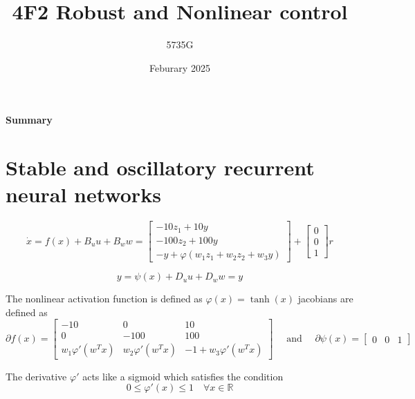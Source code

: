 \documentclass{article}
\begin{document}
\title{4F2 Robust and Nonlinear control}
\author{5735G}
\date{Feburary 2025}
\maketitle 

\begin{center}
    \textbf{Summary} \\
    
\end{center}

\section{Stable and oscillatory recurrent neural networks}

\begin{equation}
    \dot{x} = f(x) + B_u u + B_w w = \begin{bmatrix}
        -10z_1 + 10y \\
        -100z_2 + 100y \\
        -y + \varphi(w_1z_1 + w_2z_2 + w_3y)
    \end{bmatrix} + \begin{bmatrix}
        0 \\ 0 \\ 1
    \end{bmatrix} r
\end{equation}

\begin{equation}
    y = \psi(x) + D_u u + D_w w = y
\end{equation}

The nonlinear activation function is defined as $\varphi(x) = \tanh(x)$ jacobians are defined as
\begin{equation}
    \partial f(x) = \begin{bmatrix}
        -10 & 0 & 10 \\
        0 & -100 & 100 \\
        w_1 \varphi'(w^T x) & w_2 \varphi'(w^T x) & -1 + w_3 \varphi'(w^T x)
    \end{bmatrix} \quad \text{ and } \quad \partial \psi(x) = \begin{bmatrix}
        0 & 0 & 1
    \end{bmatrix}
\end{equation}

The derivative $\varphi'$ acts like a sigmoid which satisfies the condition
\begin{equation}
    0 \leq \varphi'(x) \leq 1 \quad \forall x \in \mathbb{R}
\end{equation}
\end{document}
